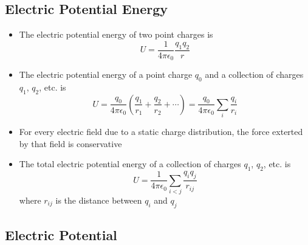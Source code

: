 \documentclass{article}
\newcommand{\ke}{\frac{1}{4 \pi \epsilon_0}}
\begin{document}
\subsection{Electric Potential Energy}

\begin{itemize}
  \item The electric potential energy of two point charges is \[U = \ke \frac{q_1 q_2}{r}\]

  \item The electric potential energy of a point charge $q_0$ and a collection of charges $q_1$, $q_2$, etc. is \[U = \frac{q_0}{4 \pi \epsilon_0} \left( \frac{q_1}{r_1} + \frac{q_2}{r_2} + \cdots \right) = \frac{q_0}{4 \pi \epsilon_0} \sum_i \frac{q_i}{r_i}\]

  \item For every electric field due to a static charge distribution, the force exterted by that field is conservative

  \item The total electric potential energy of a collection of charges $q_1$, $q_2$, etc. is \[U = \ke \sum_{i < j} \frac{q_i q_j}{r_{ij}}\] where $r_{ij}$ is the distance between $q_i$ and $q_j$
\end{itemize}

\subsection{Electric Potential}
\end{document}
